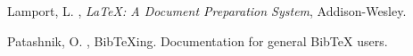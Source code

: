 \documentclass{article}
\begin{document}
%
%

\begin{thebibliography}{xx}

Lamport, L.  \harvardyearright , {\em {\LaTeX \rm:} {A}
  Document Preparation System}, Addison-Wesley.

Patashnik, O.  \harvardyearright , {{BibTeXing}}.
\newblock Documentation for general BibTeX users.

\end{thebibliography}
\end{document}
